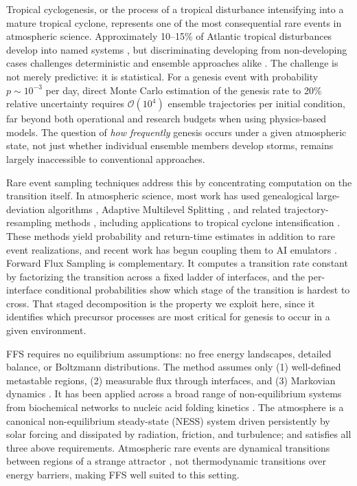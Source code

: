 \documentclass[11pt]{article}
\begin{document}
Tropical cyclogenesis, or the process of a tropical disturbance intensifying into a mature tropical cyclone, represents one of the most consequential rare events in atmospheric science. Approximately 10--15\% of Atlantic tropical disturbances develop into named systems \citep{Frank1970, gray1968global, Landsea1998}, but discriminating developing from non-developing cases challenges deterministic and ensemble approaches alike
\citep{Titley2000, Halperin2013}. The challenge is not merely predictive: it is statistical. For a genesis event with probability $p \sim 10^{-3}$ per day, direct Monte Carlo estimation of the genesis rate to 20\% relative uncertainty requires $\mathcal{O}(10^4)$ ensemble trajectories per initial condition, far beyond both operational and research budgets when using physics-based models. The question of \textit{how frequently} genesis occurs under a given atmospheric state, not just whether individual ensemble members develop storms, remains largely inaccessible to
conventional approaches.

Rare event sampling techniques address this by concentrating computation on the transition itself. In atmospheric science, most work has used genealogical large-deviation algorithms \citep{ragone2018computation, galfi2019large}, Adaptive Multilevel Splitting \citep[AMS;][]{cerou2007adaptive}, and related trajectory-resampling methods \citep{webber2019practical, finkel2023revealing, finkel2024bringing}, including applications to tropical cyclone intensification \citep{plotkin2019maximizing}. These methods yield probability and return-time estimates in addition to rare event realizations, and recent work has begun coupling them to AI emulators \citep{lancelin2025ai, manshausen2025extreme}. Forward Flux Sampling \citep[FFS;][]{allen2006forward, allen2009forward, valeriani2007computing, hussain2020studying} is complementary. It computes a transition rate constant by factorizing the transition across a fixed ladder of interfaces, and the per-interface conditional probabilities show which stage of the transition is hardest to cross. That staged decomposition is the property we exploit here, since it identifies which precursor processes are most critical for genesis to occur in a given environment.

FFS requires no equilibrium assumptions: no free energy landscapes, detailed balance, or Boltzmann distributions. The method assumes only (1) well-defined metastable regions, (2) measurable flux through interfaces, and (3) Markovian dynamics \citep{allen2009forward}.
It has been applied across a broad range of non-equilibrium systems from biochemical networks \citep{allen2005sampling} to nucleic acid folding kinetics \citep{schreck2015dna}. The atmosphere is a canonical non-equilibrium steady-state (NESS) system driven persistently by solar forcing and dissipated by radiation, friction, and turbulence; and satisfies all three above requirements. Atmospheric rare events are dynamical transitions between regions of a strange attractor \citep{lorenz1969atmospheric,touchette2009large}, not thermodynamic transitions over energy barriers, making FFS well suited to this setting.
\end{document}
